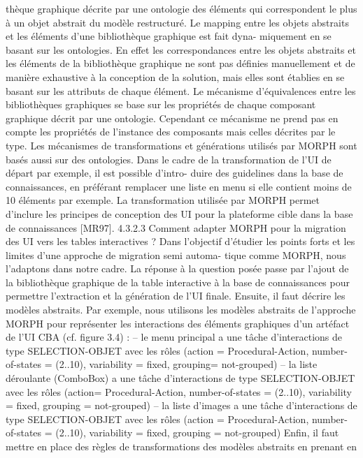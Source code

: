 \documentclass{article}
\begin{document}
thèque graphique décrite par une ontologie des éléments qui correspondent le plus à un objet abstrait
du modèle restructuré.
Le mapping entre les objets abstraits et les éléments d’une bibliothèque graphique est fait dyna-
miquement en se basant sur les ontologies. En effet les correspondances entre les objets abstraits et
les éléments de la bibliothèque graphique ne sont pas déﬁnies manuellement et de manière exhaustive
à la conception de la solution, mais elles sont établies en se basant sur les attributs de chaque élément.
Le mécanisme d’équivalences entre les bibliothèques graphiques se base sur les propriétés de chaque
composant graphique décrit par une ontologie. Cependant ce mécanisme ne prend pas en compte les
propriétés de l’instance des composants mais celles décrites par le type.
Les mécanismes de transformations et générations utilisés par MORPH sont basés aussi sur des
ontologies. Dans le cadre de la transformation de l’UI de départ par exemple, il est possible d’intro-
duire des guidelines dans la base de connaissances, en préférant remplacer une liste en menu si elle
contient moins de 10 éléments par exemple.
La transformation utilisée par MORPH permet d’inclure les principes de conception des UI pour
la plateforme cible dans la base de connaissances [MR97].
4.3.2.3
Comment adapter MORPH pour la migration des UI vers les tables interactives ?
Dans l’objectif d’étudier les points forts et les limites d’une approche de migration semi automa-
tique comme MORPH, nous l’adaptons dans notre cadre.
La réponse à la question posée passe par l’ajout de la bibliothèque graphique de la table interactive
à la base de connaissances pour permettre l’extraction et la génération de l’UI ﬁnale. Ensuite, il faut
décrire les modèles abstraits. Par exemple, nous utilisons les modèles abstraits de l’approche MORPH
pour représenter les interactions des éléments graphiques d’un artéfact de l’UI CBA (cf. ﬁgure 3.4) :
– le menu principal a une tâche d’interactions de type SELECTION-OBJET avec les rôles (action
= Procedural-Action, number-of-states = (2..10), variability = ﬁxed, grouping= not-grouped)
– la liste déroulante (ComboBox) a une tâche d’interactions de type SELECTION-OBJET avec
les rôles (action= Procedural-Action, number-of-states = (2..10), variability = ﬁxed, grouping =
not-grouped)
– la liste d’images a une tâche d’interactions de type SELECTION-OBJET avec les rôles (action
= Procedural-Action, number-of-states = (2..10), variability = ﬁxed, grouping = not-grouped)
Enﬁn, il faut mettre en place des règles de transformations des modèles abstraits en prenant en
\end{document}
